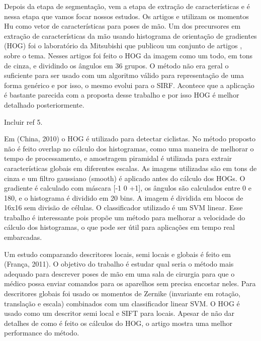 Depois da etapa de segmentação, vem a etapa de extração de características e é nessa etapa que vamos focar nossos estudos. Os artigos \cite{ref2} e \cite{ref1} utilizam os momentos Hu como vetor de características para poses de mão.
Um dos precursores em extração de características da mão usando histograma de orientação de gradientes (HOG) foi o laboratório da Mitsubishi que publicou um conjunto de artigos \cite{ref3}, \cite{ref4} sobre o tema. Nesses artigos foi feito o HOG da imagem como um todo, em tons de cinza, e dividindo os ângulos em 36 grupos. O método não era geral o suficiente para ser usado com um algoritmo válido para representação de uma forma genérico e por isso, o mesmo evolui para o SIRF. Acontece que a aplicação é bastante parecida com a proposta desse trabalho e por isso HOG é melhor detalhado posteriormente.

\todo Incluir ref 5.

Em \cite{ref6} (China, 2010) o HOG é utilizado para detectar ciclistas. No método proposto não é feito overlap no cálculo dos histogramas, como uma maneira de melhorar o tempo de processamento, e amostragem piramidal é utilizada para extrair características globais em diferentes escalas. As imagens utilizadas são em tons de cinza e um filtro gaussiano (smooth) é aplicado antes do cálculo dos HOGs. O gradiente é calculado com máscara [-1 0 +1], os ângulos são calculados entre 0 e 180, e o histograma é dividido em 20 bins. A imagem é dividida em blocos de 16x16 sem divisão de células. O classificador utilizado é um SVM linear. Esse trabalho é interessante pois propõe um método para melhorar a velocidade do cálculo dos histogramas, o que pode ser útil para aplicações em tempo real embarcadas.

Um estudo comparando descritores locais, semi locais e globais é feito em \cite{ref7} (França, 2011). O objetivo do trabalho é estudar qual seria o método mais adequado para descrever poses de mão em uma sala de cirurgia para que o médico possa enviar comandos para os aparelhos sem precisa encostar neles. Para descritores globais foi usado os momentos de Zernike (invariante em rotação, translação e escala) combinados com um classificador linear SVM. O HOG é usado como um descritor semi local e SIFT para locais. Apesar de não dar detalhes de como é feito os cálculos do HOG, o artigo mostra uma melhor performance do método.

